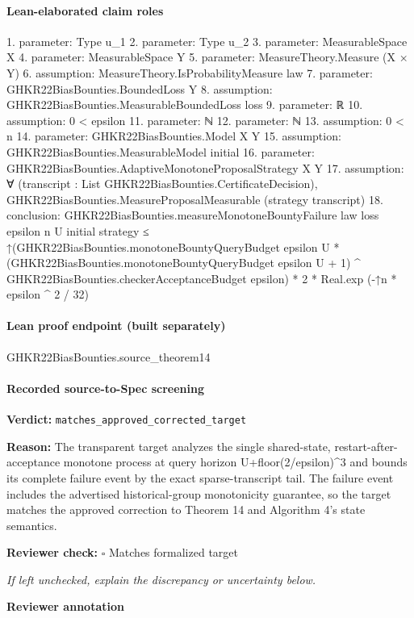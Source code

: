 \documentclass[10pt]{article}
\newcommand{\reviewerbox}{%
  \par\noindent\fbox{\parbox{0.96\linewidth}{\rule{0pt}{0.38in}}}\par
}
\newcommand{\reviewmatch}[1]{%
  \par\noindent\textbf{Reviewer check:} $\square$\; #1\par
  \noindent\emph{If left unchecked, explain the discrepancy or uncertainty below.}\par
}
\begin{document}
\paragraph{Lean-elaborated claim roles}\begin{ReviewVerbatim}
1. parameter: Type u_1
2. parameter: Type u_2
3. parameter: MeasurableSpace X
4. parameter: MeasurableSpace Y
5. parameter: MeasureTheory.Measure (X × Y)
6. assumption: MeasureTheory.IsProbabilityMeasure law
7. parameter: GHKR22BiasBounties.BoundedLoss Y
8. assumption: GHKR22BiasBounties.MeasurableBoundedLoss loss
9. parameter: ℝ
10. assumption: 0 < epsilon
11. parameter: ℕ
12. parameter: ℕ
13. assumption: 0 < n
14. parameter: GHKR22BiasBounties.Model X Y
15. assumption: GHKR22BiasBounties.MeasurableModel initial
16. parameter: GHKR22BiasBounties.AdaptiveMonotoneProposalStrategy X Y
17. assumption: ∀ (transcript : List GHKR22BiasBounties.CertificateDecision),
  GHKR22BiasBounties.MeasureProposalMeasurable (strategy transcript)
18. conclusion: GHKR22BiasBounties.measureMonotoneBountyFailure law loss epsilon n U initial strategy ≤
  ↑(GHKR22BiasBounties.monotoneBountyQueryBudget epsilon U *
          (GHKR22BiasBounties.monotoneBountyQueryBudget epsilon U + 1) ^
            GHKR22BiasBounties.checkerAcceptanceBudget epsilon) *
      2 *
    Real.exp (-↑n * epsilon ^ 2 / 32)
\end{ReviewVerbatim}

\paragraph{Lean proof endpoint (built separately)}\begin{ReviewVerbatim}
GHKR22BiasBounties.source_theorem14
\end{ReviewVerbatim}

\paragraph{Recorded source-to-Spec screening}
\textbf{Verdict:} \texttt{matches\_approved\_corrected\_target}
\\
{\raggedright
\textbf{Reason:} The transparent target analyzes the single shared-\allowbreak{}state, restart-\allowbreak{}after-\allowbreak{}acceptance monotone process at query horizon U+floor(2/\allowbreak{}epsilon)\textasciicircum{}3 and bounds its complete failure event by the exact sparse-\allowbreak{}transcript tail.\allowbreak{} The failure event includes the advertised historical-\allowbreak{}group monotonicity guarantee, so the target matches the approved correction to Theorem 14 and Algorithm 4's state semantics.\allowbreak{}
\par}
\reviewmatch{Matches formalized target}
\noindent\textbf{Reviewer annotation}\par
\reviewerbox
\clearpage
\hypertarget{source-claim-34a9d9f786637448}{}
\end{document}
